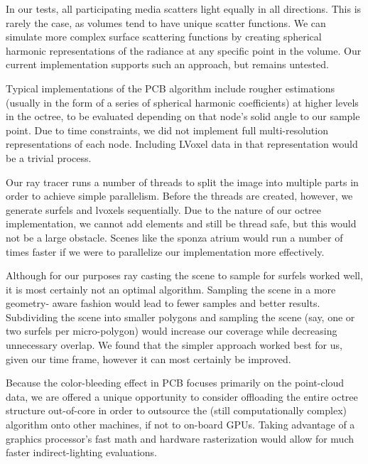 \documentclass[12pt]{ucthesis}
\begin{document}
\vspace{5mm}

In our tests, all participating media scatters light equally in all directions.  This is rarely the case, as volumes tend to have unique scatter functions.  We can simulate more complex surface scattering functions by creating spherical harmonic representations of the radiance at any specific point in the volume.  Our current implementation supports such an approach, but remains untested.

\vspace{5mm}

Typical implementations of the PCB algorithm include rougher estimations (usually in the form of a series of spherical harmonic coefficients) at higher levels in the octree, to be evaluated depending on that node's solid angle to our sample point.  Due to time constraints, we did not implement full multi-resolution representations of each node.  Including LVoxel data in that representation would be a trivial process.

\vspace{5mm}

Our ray tracer runs a number of threads to split the image into multiple parts  in order to achieve simple parallelism.  Before the threads are created, however, we generate surfels and lvoxels sequentially.  Due to the nature of our octree implementation, we cannot add elements and still be thread safe, but this would not be a large obstacle.  Scenes like the sponza atrium would run a number of times faster if we were to parallelize our implementation more effectively.

\vspace{5mm}

Although for our purposes ray casting the scene to sample for surfels worked well, it is most certainly not an optimal algorithm.  Sampling the scene in a more geometry- aware fashion would lead to fewer samples and better results.  Subdividing the scene into smaller polygons and sampling the scene (say, one or two surfels per micro-polygon) would increase our coverage while decreasing unnecessary overlap.  We found that the simpler approach worked best for us, given our time frame, however it can most certainly be improved.

\vspace{5mm}

Because the color-bleeding effect in PCB focuses primarily on the point-cloud data, we are offered a unique opportunity to consider offloading the entire octree structure out-of-core in order to outsource the (still computationally complex) algorithm onto other machines, if not to on-board GPUs.  Taking advantage of a graphics processor's fast math and hardware rasterization would allow for much faster indirect-lighting evaluations.
\end{document}
